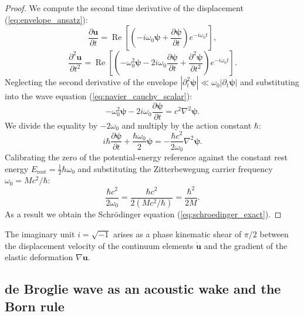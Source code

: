 \documentclass[11pt,a4paper]{article}
\theoremstyle{definition}
\theoremstyle{remark}
\begin{document}
\begin{proof}
We compute the second time derivative of the displacement (\ref{eq:envelope_ansatz}):
\begin{equation}
	\frac{\partial \mathbf{u}}{\partial t} = \operatorname{Re}\left[ \left( -i\omega_0 \boldsymbol{\psi} + \frac{\partial \boldsymbol{\psi}}{\partial t} \right) e^{-i\omega_0 t} \right],
\end{equation}
\begin{equation}
	\frac{\partial^2 \mathbf{u}}{\partial t^2} = \operatorname{Re}\left[ \left( -\omega_0^2 \boldsymbol{\psi} - 2i\omega_0 \frac{\partial \boldsymbol{\psi}}{\partial t} + \frac{\partial^2 \boldsymbol{\psi}}{\partial t^2} \right) e^{-i\omega_0 t} \right].
\end{equation}
Neglecting the second derivative of the envelope $|\partial_t^2 \boldsymbol{\psi}| \ll \omega_0 |\partial_t \boldsymbol{\psi}|$ and substituting into the wave equation (\ref{eq:navier_cauchy_scalar}):
\begin{equation}
	-\omega_0^2 \boldsymbol{\psi} - 2i\omega_0 \frac{\partial \boldsymbol{\psi}}{\partial t} = c^2 \nabla^2 \boldsymbol{\psi}.
\end{equation}
We divide the equality by $-2\omega_0$ and multiply by the action constant $\hbar$:
\begin{equation}
	i\hbar \frac{\partial \boldsymbol{\psi}}{\partial t} + \frac{\hbar\omega_0}{2} \boldsymbol{\psi} = -\frac{\hbar c^2}{2\omega_0} \nabla^2 \boldsymbol{\psi}.
\end{equation}
Calibrating the zero of the potential-energy reference against the constant rest energy $E_{\mathrm{rest}} = \frac{1}{2}\hbar\omega_0$ and substituting the Zitterbewegung carrier frequency $\omega_0 = M c^2 / \hbar$:
\begin{equation}
	\frac{\hbar c^2}{2\omega_0} = \frac{\hbar c^2}{2 (M c^2 / \hbar)} = \frac{\hbar^2}{2M}.
\end{equation}
As a result we obtain the Schrödinger equation (\ref{eq:schroedinger_exact}).
\end{proof}

The imaginary unit $i = \sqrt{-1}$ arises as a phase kinematic shear of $\pi/2$ between the displacement velocity of the continuum elements $\dot{\mathbf{u}}$ and the gradient of the elastic deformation $\nabla \mathbf{u}$.

\subsection{de Broglie wave as an acoustic wake and the Born rule}
\end{document}
